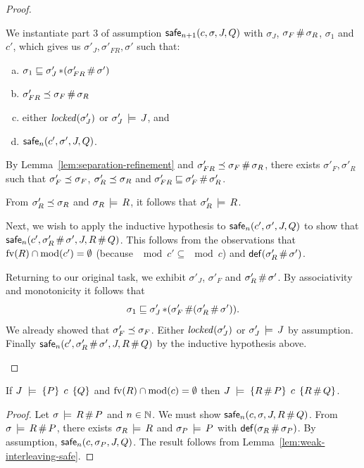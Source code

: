 \documentclass[11pt]{article}
\begin{document}
\begin{proof}
\begin{enumerate}
		We instantiate part 3 of assumption $\mathsf{safe}_{n+1}(c,\sigma,J,Q)$ with $\sigma_J$, $\sigma_F \operatorname{\#} \sigma_R$, $\sigma_1$ and $c'$, which gives us $\sigma'_J, \sigma'_{FR}, \sigma'$ such that: \begin{enumerate}[(a)]
			\item $\sigma_1 \sqsubseteq \sigma'_J \operatorname{\ast} (\sigma'_{FR} \operatorname{\#} \sigma')$
			\item $\sigma'_{FR} \preceq \sigma_F \operatorname{\#} \sigma_R$
			\item either $\mathit{locked}(\sigma'_J)$ or $\sigma'_J \,\models\, J$, and
			\item $\mathsf{safe}_{n}(c',\sigma',J,Q)$.
		\end{enumerate}	

		By Lemma~\ref{lem:separation-refinement} and $\sigma'_{FR} \preceq \sigma_F \operatorname{\#} \sigma_R$, there exists $\sigma'_F,\sigma'_R$ such that $\sigma'_F \preceq \sigma_F$, $\sigma'_R \preceq \sigma_R$ and $\sigma'_{FR} \sqsubseteq \sigma'_F \operatorname{\#} \sigma'_R$. 

		From $\sigma'_R \preceq \sigma_R$ and $\sigma_R \,\models\, R$, it follows that $\sigma'_R \,\models\, R$. 

		Next, we wish to apply the inductive hypothesis to $\mathsf{safe}_{n}(c',\sigma',J,Q)$ to show that $\mathsf{safe}_{n}(c',\sigma'_R \operatorname{\#} \sigma',J,R \operatorname{\#} Q)$. This follows from the observations that $\mathrm{fv}(R) \cap \mathrm{mod}(c') = \operatorname{\emptyset}$ (because $\mod{c'} \subseteq \mod{c}$) and $\mathsf{def}(\sigma'_R \operatorname{\#} \sigma')$. 

		Returning to our original task, we exhibit $\sigma'_J$, $\sigma'_F$ and $\sigma'_R \operatorname{\#} \sigma'$. By associativity and monotonicity it follows that \[ \sigma_1 \sqsubseteq \sigma'_J \operatorname{\ast} (\sigma'_F \operatorname{\#} (\sigma'_R \operatorname{\#} \sigma')).\] We already showed that $\sigma'_F \preceq \sigma_F$. Either $\mathit{locked}(\sigma'_J)$ or $\sigma'_J \,\models\, J$ by assumption. Finally $\mathsf{safe}_{n}(c',\sigma'_R \operatorname{\#} \sigma',J,R \operatorname{\#} Q)$ by the inductive hypothesis above. 

	\end{enumerate}
\end{proof}

\begin{lemma}
	If $J\;\models\;\left\lbrace P \right\rbrace\;c\;\left\lbrace Q \right\rbrace$ and $\mathrm{fv}(R) \cap \mathrm{mod}(c) = \operatorname{\emptyset}$ then $J\;\models\;\left\lbrace R \operatorname{\#} P \right\rbrace\;c\;\left\lbrace R \operatorname{\#} Q \right\rbrace$. 
\end{lemma}

\begin{proof}
	Let $\sigma \,\models\, R \operatorname{\#} P$ and $n \in \mathbb{N}$. We must show $\mathsf{safe}_{n}(c,\sigma,J,R\operatorname{\#} Q)$. From $\sigma \,\models\, R \operatorname{\#} P$, there exists $\sigma_R \,\models\, R$ and $\sigma_P \,\models\, P$ with $\mathsf{def}(\sigma_R \operatorname{\#} \sigma_P)$. By assumption, $\mathsf{safe}_{n}(c,\sigma_P,J,Q)$. The result follows from Lemma~\ref{lem:weak-interleaving-safe}. 
\end{proof}
\end{document}
